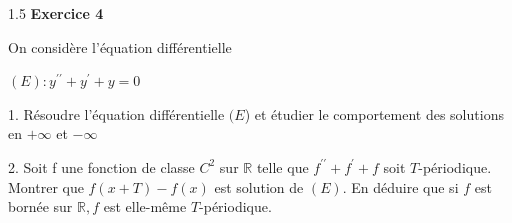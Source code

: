\documentclass[12pt]{article}
\begin{document}
\begin{spacing}{1.5}
\medskip\textbf{Exercice 4}

On considère l'équation différentielle
 
 $(E): y^{\prime\prime}+y^{\prime}+y=0$
 
 1. Résoudre l'équation différentielle $(E$) et étudier le comportement des solutions en $+\infty$ et $-\infty$

 2. Soit f une fonction de classe $C^2$ sur $\mathbb{R}$ telle que $f^{\prime\prime}+f^{\prime}+f$ soit $T$-périodique. Montrer que $f(x +T)-f(x)$ est solution de $(E)$. En déduire que si $f$ est bornée sur $\mathbb{R}, f$ est elle-même $T$-périodique.
 

\end{spacing}
\end{document}
